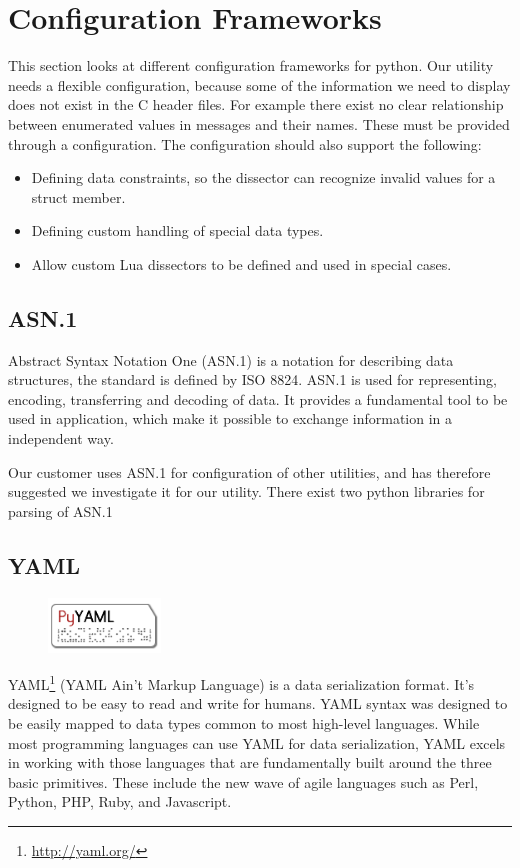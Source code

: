 \section{Configuration Frameworks}
\label{sec:pre:config}
This section looks at different configuration frameworks for python. Our
utility needs a flexible configuration, because some of the information we need
to display does not exist in the C header files. For example there exist no
clear relationship between enumerated values in messages and their names.
These must be provided through a configuration. The configuration should also
support the following:
\begin{itemize}
	\item Defining data constraints, so the dissector can recognize invalid
		values for a struct member.
	\item Defining custom handling of special data types.
	\item Allow custom Lua dissectors to be defined and used in special cases.
\end{itemize}

\subsection{ASN.1}
Abstract Syntax Notation One (ASN.1) is a notation for describing data
structures, the standard is defined by ISO 8824. ASN.1 is used for
representing, encoding, transferring and decoding of data. It provides a
fundamental tool to be used in application, which make it possible to exchange
information in a independent way.

Our customer uses ASN.1 for configuration of other utilities, and has therefore
suggested we investigate it for our utility. There exist two python libraries
for parsing of ASN.1

\subsection{YAML}
\begin{figure}
	\begin{center}
	\vspace{-30pt}
		\includegraphics[width=3cm]{./planning/img/pyyaml_logo}
	\vspace{-30pt}
	\end{center}
\end{figure}
YAML\footnote{\url{http://yaml.org/}} (YAML Ain't Markup Language) is a data
serialization format. It's designed to be easy to read and write for humans.
YAML syntax was designed to be easily mapped to data types common to most
high-level languages. While most programming languages can use YAML for data
serialization, YAML excels in working with those languages that are
fundamentally built around the three basic primitives. These include the new
wave of agile languages such as Perl, Python, PHP, Ruby, and Javascript.

